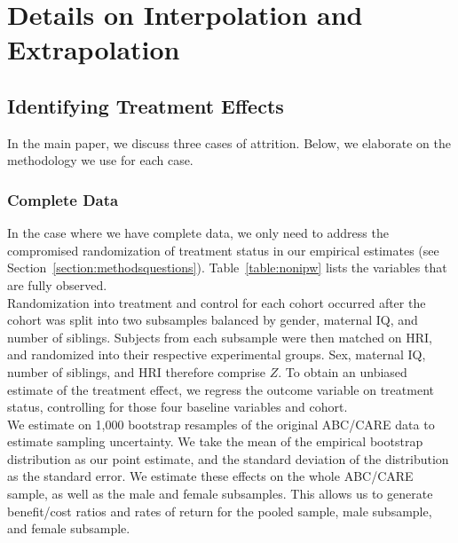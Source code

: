 \section{Details on Interpolation and Extrapolation} \label{appendix:methodology}

\subsection{Identifying Treatment Effects}
\label{app:method_identify}

\noindent In the main paper, we discuss three cases of attrition. Below, we elaborate on the methodology we use for each case. \\

\subsubsection{Complete Data}
\label{app:method_fullobs}

\noindent  In the case where we have complete data, we only need to address the compromised randomization
of treatment status in our empirical estimates (see Section~\ref{section:methodsquestions}). Table~\ref{table:nonipw} lists the variables that are fully observed. \\

\noindent Randomization into treatment and control for each cohort occurred after the cohort was split
into two subsamples balanced by gender, maternal IQ,
and number of siblings. Subjects from each subsample were then matched on HRI, and randomized
into their respective experimental groups. Sex, maternal IQ, number of siblings, and HRI
therefore comprise $Z$. To obtain an
unbiased estimate of the treatment effect, we regress the outcome variable on treatment status,
controlling for those four baseline variables and cohort. \\

\noindent We estimate on 1,000 bootstrap resamples of the original ABC/CARE data to estimate sampling uncertainty. We take the mean of the empirical bootstrap distribution as our point estimate, and the standard deviation
of the distribution as the standard error. We estimate these effects on the
whole ABC/CARE sample, as well as the male and female subsamples. This allows us to generate
benefit/cost ratios and rates of return for the pooled sample, male subsample, and female subsample. \\

